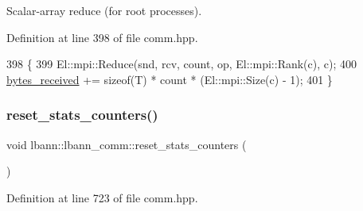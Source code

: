 Scalar-\/array reduce (for root processes). 

Definition at line 398 of file comm.\+hpp.


\begin{DoxyCode}
398                                                                                    \{
399     El::mpi::Reduce(snd, rcv, count, op, El::mpi::Rank(c), c);
400     \hyperlink{classlbann_1_1lbann__comm_afb99f57f7eafc0695bf28e6c26a8120f}{bytes\_received} += \textcolor{keyword}{sizeof}(T) * count * (El::mpi::Size(c) - 1);
401   \}
\end{DoxyCode}
\mbox{\label{classlbann_1_1lbann__comm_adb9afab1b8af03276e6e6347f8021ef5}} 
\subsubsection{\texorpdfstring{reset\+\_\+stats\+\_\+counters()}{reset\_stats\_counters()}}
{\footnotesize\ttfamily void lbann\+::lbann\+\_\+comm\+::reset\+\_\+stats\+\_\+counters (\begin{DoxyParamCaption}{ }\end{DoxyParamCaption})\hspace{0.3cm}{\ttfamily [inline]}}



Definition at line 723 of file comm.\+hpp.


